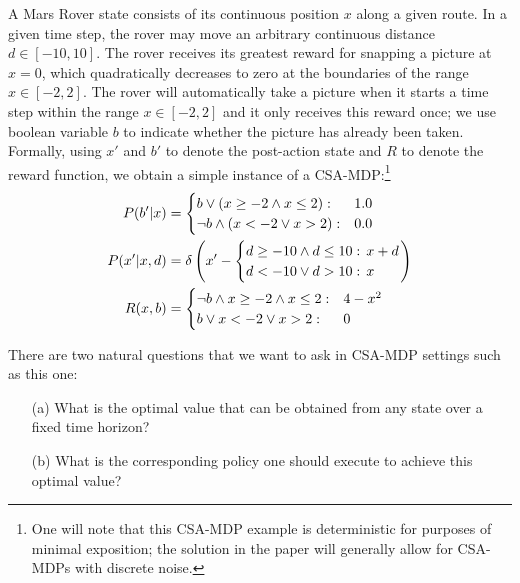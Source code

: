 \begin{example*}[\MarsRover]
\label{ex:knapsack}
A Mars Rover state consists of its continuous position $x$ along a
given route.  In a given time step, the rover may move an arbitrary
continuous distance $d \in [-10,10]$.  The rover receives its greatest
reward for snapping a picture at $x=0$, which quadratically decreases
to zero at the boundaries of the range $x \in [-2,2]$.  The rover will
automatically take a picture when it starts a time step within the
range $x \in [-2,2]$ and it only receives this reward once; we use
boolean variable $b$ to indicate whether the picture has already been
taken.  Formally, using $x'$ and $b'$ to denote the post-action state
and $R$ to denote the reward function, we obtain a simple instance of
a CSA-MDP:\footnote{One will note that this CSA-MDP example is
deterministic for purposes of minimal exposition; the solution in the
paper will generally allow for CSA-MDPs with discrete noise.}
\begin{align} 
P(b'|x) & = 
\begin{cases}
b \lor (x \geq -2 \land x \leq 2): & 1.0\\
\neg b \land (x < -2 \lor x > 2):  & 0.0
\end{cases} \label{eq:mr_discrete_trans} \\
P(x'|x,d) & = \delta \left( x' - \begin{cases}
d \geq -10 \land d \leq 10 : & \hspace{-2mm} x + d \\
d < -10 \lor d > 10 : & \hspace{-2mm} x
\end{cases}
\right) \label{eq:mr_cont_trans} \\
R(x,b) & = \begin{cases}
\neg b \land x \geq -2 \land x \leq 2 : & 4 - x^2 \\
b \lor x < -2 \lor x > 2 : & 0
\end{cases} \label{eq:mr_reward}
\end{align}
\end{example*}
There are two natural questions that we want to ask in CSA-MDP settings
such as this one:
\begin{enumerate}
\item[(a)] What is the optimal value that can be obtained from any state 
over a fixed time horizon?
\item[(b)] What is the corresponding policy one should execute to
achieve this optimal value?
\end{enumerate}

